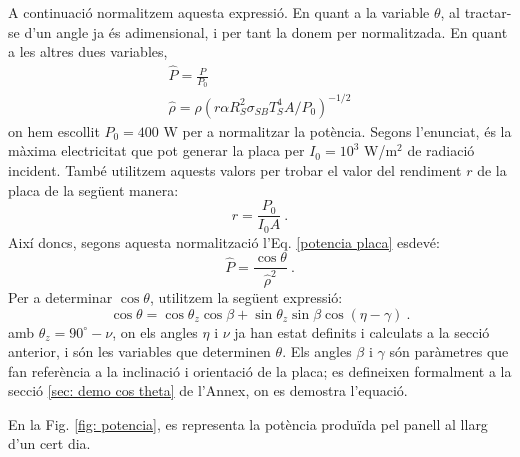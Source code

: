 \documentclass[11pt]{article}
\begin{document}
A continuació normalitzem aquesta expressió. En quant a la variable $\theta$, al tractar-se d'un angle ja és adimensional, i per tant la donem per normalitzada. En quant a les altres dues variables,
\begin{align}
    \hat{P}=\frac{P}{P_0} \label{P normalizada} \\
    \hat{\rho}= \rho \left( r \alpha R_S^2\sigma_{SB}T_S^4A/P_0 \right)^{-1/2} \label{rho normalizada}
\end{align}
on hem escollit $P_0=400$ W per a normalitzar la potència. Segons l'enunciat, és la màxima electricitat que pot generar la placa per $I_0=10^3$ W/$\text{m}^2$ de radiació incident. També utilitzem aquests valors per trobar el valor del rendiment $r$ de la placa de la següent manera:
\begin{equation}
     r = \frac{P_0}{I_0A} \ .
\end{equation}
Així doncs, segons aquesta normalització l'Eq. \eqref{potencia placa} esdevé:
\begin{equation}
    \hat{P} = \frac{\cos{\theta}}{\hat{\rho}^2} \ .
    \label{pot norm}
\end{equation}
Per a determinar $\cos{\theta}$, utilitzem la següent expressió:
\begin{equation}
    \cos \theta = \cos \theta_z \cos \beta + \sin \theta_z \sin \beta \cos (\eta - \gamma) \ .
    \label{cos theta}
\end{equation}
amb $\theta_z = 90^{\circ}-\nu$, on els angles $\eta$ i $\nu$ ja han estat definits i calculats a la secció anterior, i són les variables que determinen $\theta$. Els angles $\beta$ i $\gamma$ són paràmetres que fan referència a la inclinació i orientació de la placa; es defineixen formalment a la secció \ref{sec: demo cos theta} de l'Annex, on es demostra l'equació.

En la Fig. \ref{fig: potencia}, es representa la potència produïda pel panell al llarg d'un cert dia.
\end{document}
